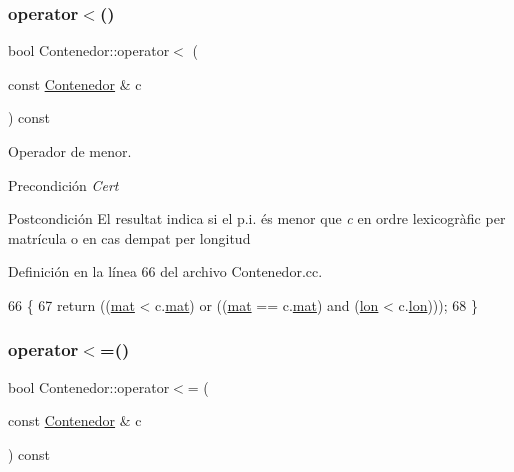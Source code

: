 \subsubsection{\texorpdfstring{operator$<$()}{operator<()}}
{\footnotesize\ttfamily bool Contenedor\+::operator$<$ (\begin{DoxyParamCaption}\item[{const \hyperlink{class_contenedor}{Contenedor} \&}]{c }\end{DoxyParamCaption}) const}



Operador de menor. 

\begin{DoxyPrecond}{Precondición}
{\itshape Cert} 
\end{DoxyPrecond}
\begin{DoxyPostcond}{Postcondición}
El resultat indica si el p.\+i. és menor que {\itshape c} en ordre lexicogràfic per matrícula o en cas d\textquotesingle{}empat per longitud 
\end{DoxyPostcond}


Definición en la línea 66 del archivo Contenedor.\+cc.


\begin{DoxyCode}
66                                                     \{
67   \textcolor{keywordflow}{return} ((\hyperlink{class_contenedor_a219718cff2c0f94314defbf8d747bfa9}{mat} < c.\hyperlink{class_contenedor_a219718cff2c0f94314defbf8d747bfa9}{mat}) or ((\hyperlink{class_contenedor_a219718cff2c0f94314defbf8d747bfa9}{mat} == c.\hyperlink{class_contenedor_a219718cff2c0f94314defbf8d747bfa9}{mat}) and (\hyperlink{class_contenedor_a364e04e5a1c7787463981f192f48e4ce}{lon} < c.\hyperlink{class_contenedor_a364e04e5a1c7787463981f192f48e4ce}{lon})));
68 \}
\end{DoxyCode}
\mbox{\label{class_contenedor_a587d437b6c6973c3b7008f579c4590a4}} 
\subsubsection{\texorpdfstring{operator$<$=()}{operator<=()}}
{\footnotesize\ttfamily bool Contenedor\+::operator$<$= (\begin{DoxyParamCaption}\item[{const \hyperlink{class_contenedor}{Contenedor} \&}]{c }\end{DoxyParamCaption}) const}



